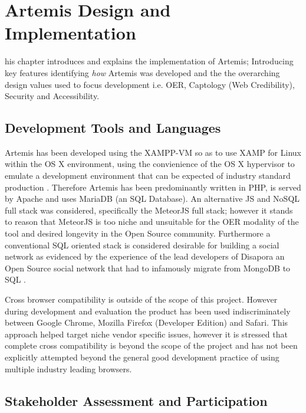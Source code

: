 %
%
\let\textcircled=\pgftextcircled
\chapter{Artemis Design and Implementation}
\label{Artemis Design and Implementation}

his chapter introduces and explains the implementation of Artemis; Introducing key features identifying \textit{how} Artemis was developed and the the overarching design values used to focus development i.e. OER, Captology (Web Credibility), Security and Accessibility.


\section{Development Tools and Languages}

Artemis has been developed using the XAMPP-VM so as to use XAMP for Linux within the OS X environment, using the convienience of the OS X hypervisor to emulate a development environment that can be expected of industry standard production \cite{ApacheFriends.org}. Therefore Artemis has been predominantly written in PHP, is served by Apache and uses MariaDB (an SQL Database). An alternative  JS and NoSQL full stack was considered, specifically the MeteorJS full stack; however it stands to reason that MeteorJS is too niche and unsuitable for the OER modality of the tool and desired longevity in the Open Source community. Furthermore a conventional SQL oriented stack is considered desirable for building a social network as evidenced by the experience of the lead developers of Disapora an Open Source social network that had to infamously migrate from MongoDB to SQL \cite{Mei}.

Cross browser compatibility is outside of the scope of this project. However during development and evaluation the product has been used indiscriminately between Google Chrome, Mozilla Firefox (Developer Edition) and Safari. This approach helped target niche vendor specific issues, however it is stressed that complete cross compatibility is beyond the scope of the project and has not been explicitly attempted beyond the general good development practice of using multiple industry leading browsers.







\section{Stakeholder Assessment and Participation}


